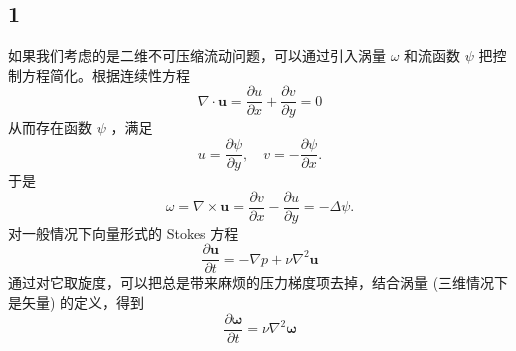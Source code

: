 \documentclass[12pt]{article}
\begin{document}
\subsection{1}

如果我们考虑的是二维不可压缩流动问题，可以通过引入涡量 $\omega$ 和流函数 $\psi$ 把控制方程简化。根据连续性方程
\begin{equation}
	\nabla \cdot \bm{u}=\frac{\partial u}{\partial x}+\frac{\partial v}{\partial y}=0
\end{equation}
从而存在函数 $\psi$ ，满足
\begin{equation}
	u=\frac{\partial \psi}{\partial y}, \quad v=-\frac{\partial \psi}{\partial x} .
\end{equation}
于是
\begin{equation}
	\omega=\nabla \times \bm{u}=\frac{\partial v}{\partial x}-\frac{\partial u}{\partial y}=-\Delta \psi .
\end{equation}
对一般情况下向量形式的 Stokes 方程
\begin{equation}
	\frac{\partial \bm{u}}{\partial t} = -\nabla p + \nu \nabla^{2} \bm{u}
\end{equation}
通过对它取旋度，可以把总是带来麻烦的压力梯度项去掉，结合涡量 (三维情况下是矢量) 的定义，得到
\begin{equation}
	\frac{\partial \bm{\omega}}{\partial t} = \nu \nabla^{2} \bm{\omega}
\end{equation}
\end{document}
